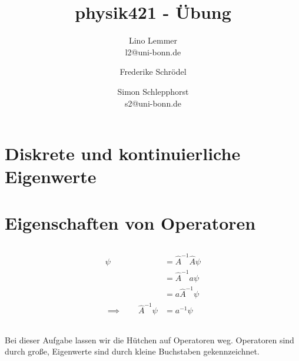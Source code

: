 

\setcounter{thezettel}{6}
\renewcommand\thesection{\arabic{thezettel}.\arabic{section}}


\title{physik421 - Übung }
\author{Lino Lemmer \\ \small{l2@uni-bonn.de} \and Frederike Schrödel \and Simon Schlepphorst\\ \small{s2@uni-bonn.de}}


\maketitle

\section{Diskrete und kontinuierliche Eigenwerte}
\section{Eigenschaften von Operatoren}

\subsection{}

\begin{align*}
    \psi &= \hat A^{-1} \hat A \psi \\
         &= \hat A^{-1} a \psi \\
         &= a \hat A^{-1} \psi \\
    \implies\qquad \hat A^{-1} \psi &= a^{-1}\psi
\end{align*}

\subsection{}

Bei dieser Aufgabe lassen wir die Hütchen auf Operatoren weg. Operatoren sind durch große, Eigenwerte sind durch kleine Buchstaben gekennzeichnet.

